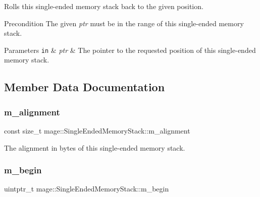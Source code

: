 Rolls this single-\/ended memory stack back to the given position.

\begin{DoxyPrecond}{Precondition}
The given {\itshape ptr} must be in the range of this single-\/ended memory stack. 
\end{DoxyPrecond}

\begin{DoxyParams}[1]{Parameters}
\mbox{\tt in}  & {\em ptr} & The pointer to the requested position of this single-\/ended memory stack. \\
\hline
\end{DoxyParams}


\subsection{Member Data Documentation}
\hypertarget{classmage_1_1_single_ended_memory_stack_aeb5bc5af575eaeb5a0f08669a717cd28}{}\label{classmage_1_1_single_ended_memory_stack_aeb5bc5af575eaeb5a0f08669a717cd28} 
\subsubsection{\texorpdfstring{m\+\_\+alignment}{m\_alignment}}
{\footnotesize\ttfamily const size\+\_\+t mage\+::\+Single\+Ended\+Memory\+Stack\+::m\+\_\+alignment\hspace{0.3cm}{\ttfamily [private]}}

The alignment in bytes of this single-\/ended memory stack. \hypertarget{classmage_1_1_single_ended_memory_stack_a859a80ab120c14e3ebf4a310d5263507}{}\label{classmage_1_1_single_ended_memory_stack_a859a80ab120c14e3ebf4a310d5263507} 
\subsubsection{\texorpdfstring{m\+\_\+begin}{m\_begin}}
{\footnotesize\ttfamily uintptr\+\_\+t mage\+::\+Single\+Ended\+Memory\+Stack\+::m\+\_\+begin\hspace{0.3cm}{\ttfamily [private]}}

